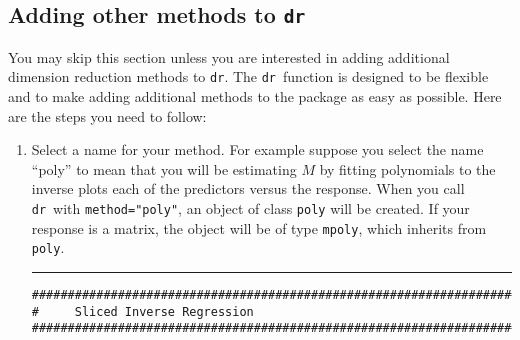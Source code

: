 \documentclass{article}
\newcommand{\dcode}[1]{{\small{\tt #1}}}
\newcommand{\ir}{{\tt dr}}
\newcommand{\sir}{{\sffamily sir}}
\begin{document}
\subsection{Adding other methods to \ir}\label{sec:newmeth}
You may skip this section unless you are interested in adding
additional dimension reduction methods to \ir. The
\ir\ function is designed to be flexible and to make adding
additional methods to the package as easy as possible. Here are
the steps you need to follow:
\begin{enumerate}
\item Select a name for your method.  For example suppose you
select the name ``poly'' to mean that you will be estimating $M$
by fitting polynomials to the inverse plots each of the predictors
versus the response.  When you call \ir\ with
\dcode{method="poly"}, an object of class \dcode{poly} will be
created.  If your response is a matrix, the object will be of type
\dcode{mpoly}, which inherits from \dcode{poly}.

\begin{table}
\hrule
\caption{The \dcode{dr.fit.M} method for \sir.}
\label{tab:fitM}
\small\begin{verbatim}
#####################################################################
#     Sliced Inverse Regression
#####################################################################


\end{verbatim}
\end{table}
\end{enumerate}
\end{document}
